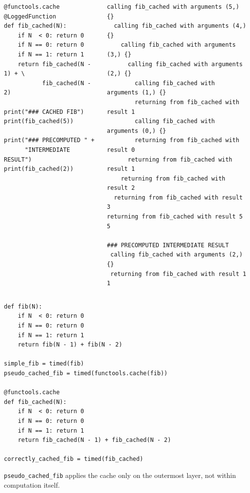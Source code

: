 \begin{frame}[fragile]
%
\begin{columns}
\begin{codebox}[Cached Fibonacci, equal height group=cachedFib]
\begin{verbatim}
@functools.cache
@LoggedFunction
def fib_cached(N):
    if N  < 0: return 0
    if N == 0: return 0
    if N == 1: return 1
    return fib_cached(N - 1) + \
           fib_cached(N - 2)

print("### CACHED FIB")
print(fib_cached(5))

print("### PRECOMPUTED " +
      "INTERMEDIATE RESULT")
print(fib_cached(2))
\end{verbatim}
\end{codebox}
%
\begin{cmdbox}[Output: Cached Fibonacci, equal height group=cachedFib]
\begin{verbatim}
calling fib_cached with arguments (5,) {}
  calling fib_cached with arguments (4,) {}
    calling fib_cached with arguments (3,) {}
      calling fib_cached with arguments (2,) {}
        calling fib_cached with arguments (1,) {}
        returning from fib_cached with result 1
        calling fib_cached with arguments (0,) {}
        returning from fib_cached with result 0
      returning from fib_cached with result 1
    returning from fib_cached with result 2
  returning from fib_cached with result 3
returning from fib_cached with result 5
5

### PRECOMPUTED INTERMEDIATE RESULT
 calling fib_cached with arguments (2,) {}
 returning from fib_cached with result 1
1
\end{verbatim}
\end{cmdbox}
\end{columns}
%
\end{frame}


\begin{frame}[fragile]
%
\begin{codebox}
\begin{verbatim}
def fib(N):
    if N  < 0: return 0
    if N == 0: return 0
    if N == 1: return 1
    return fib(N - 1) + fib(N - 2)

simple_fib = timed(fib)
pseudo_cached_fib = timed(functools.cache(fib))

@functools.cache
def fib_cached(N):
    if N  < 0: return 0
    if N == 0: return 0
    if N == 1: return 1
    return fib_cached(N - 1) + fib_cached(N - 2)

correctly_cached_fib = timed(fib_cached)
\end{verbatim}
\end{codebox}
%
\begin{hintbox}[]
\footnotesize
\texttt{pseudo\_cached\_fib} applies the cache only on the outermost layer, not within computation itself.
\end{hintbox}
%
\end{frame}

